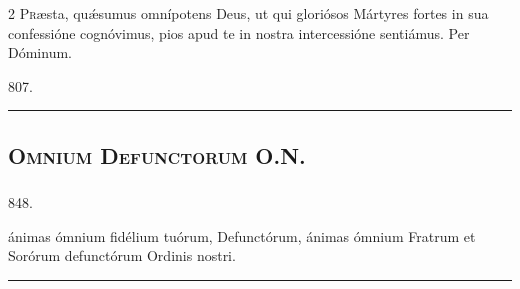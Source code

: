 \documentclass[9pt,twoside]{extarticle}
\begin{document}
\begin{multicols}{2}
\lettrine{P}ræsta, quǽsumus omnípotens Deus, ut qui gloriósos Mártyres fortes in sua confessióne cognóvimus, pios apud te in nostra intercessióne sentiámus. Per Dóminum.

\begin{tightlist}{}
\item {} 807.
\end{tightlist}

\begin{center}\textcolor{red}{\rule{\linewidth}{0.5pt}} \end{center}

\subsection*{\center {}}
\subsubsection*{\center {}}
\subsection*{\center \textsc{Omnium Defunctorum O.N.}}
\subsubsection*{\center {}}

\begin{tightlist}{}
\item {} 848. 
\item {} ánimas ómnium fidélium tuórum,  Defunctórum,  ánimas ómnium Fratrum et Sorórum defunctórum Ordinis nostri.
\end{tightlist}

\begin{center}\textcolor{red}{\rule{\linewidth}{0.5pt}} \end{center}

\subsection*{\center {}}

\end{multicols}
\end{document}
